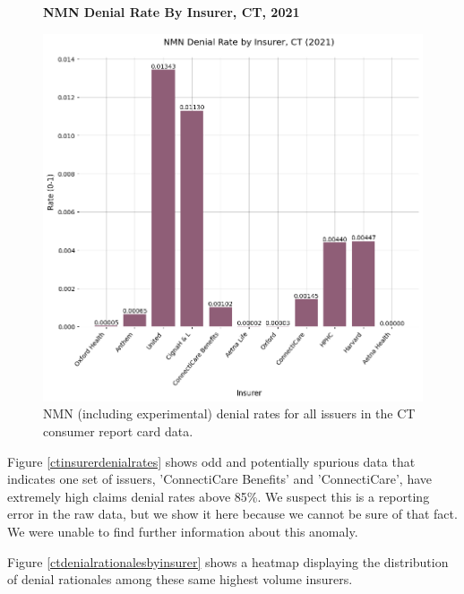 \documentclass[12pt, a4paper,twoside]{report}
\theoremstyle{plain} %
\theoremstyle{definition} %
\theoremstyle{remark} %
\numberwithin{equation}{chapter}
\begin{document}
		\clearpage
		
		\begin{figure}[h!]
			\centering
			\textbf{NMN Denial Rate By Insurer, CT, 2021}\par\medskip
			\includegraphics[width=\columnwidth]{images/ct_claims/nmn_denial_rate_by_insurer.png}
			\caption{NMN (including experimental) denial rates for all issuers in the CT consumer report card data.}
			\label{ctinsurernmndenialrates}
		\end{figure}
	
		Figure \ref{ctinsurerdenialrates} shows odd and potentially spurious data that indicates one set of issuers, 'ConnectiCare Benefits' and 'ConnectiCare', have extremely high claims denial rates above 85\%. We suspect this is a reporting error in the raw data, but we show it here because we cannot be sure of that fact. We were unable to find further information about this anomaly.
		
		Figure \ref{ctdenialrationalesbyinsurer} shows a heatmap displaying the distribution of denial rationales among these same highest volume insurers.
\end{document}
